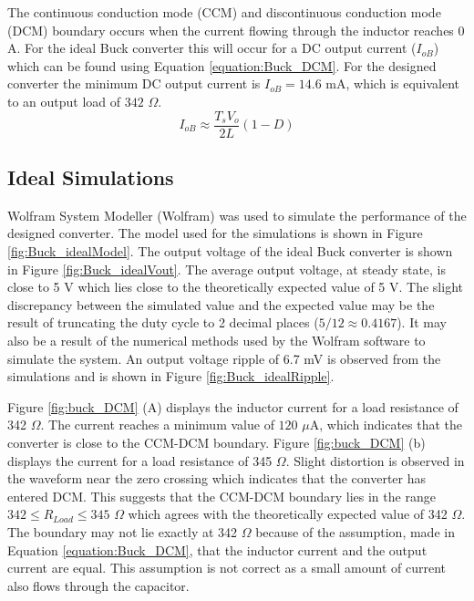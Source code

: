 \documentclass[12pt,twoside]{scrartcl}
\begin{document}
\vspace{5mm}
\noindent The continuous conduction mode (CCM) and discontinuous conduction mode (DCM) boundary occurs when the current flowing through the inductor reaches $0$ A. For the ideal Buck converter this will occur for a DC output current ($I_{oB}$) which can be found using Equation \ref{equation:Buck_DCM}. For the designed converter the minimum DC output current is $I_{oB} = 14.6$ mA, which is equivalent to an output load of $342$ $\Omega$.
\begin{equation}
I_{oB} \approx \frac{T_{s}V_{o}}{2L}(1-D) \label{equation:Buck_DCM}
\end{equation}
\pagebreak
\subsection{Ideal Simulations}
Wolfram System Modeller (Wolfram) was used to simulate the performance of the designed converter. The model used for the simulations is shown in Figure \ref{fig:Buck_idealModel}. The output voltage of the ideal Buck converter is shown in Figure \ref{fig:Buck_idealVout}. The average output voltage, at steady state, is close to 5 V which lies close to the theoretically expected value of 5 V. The slight discrepancy between the simulated value and the expected value may be the result of truncating the duty cycle to 2 decimal places ($5/12 \approx 0.4167$). It may also be a result of the numerical methods used by the Wolfram software to simulate the system. An output voltage ripple of 6.7 mV is observed from the simulations and is shown in Figure \ref{fig:Buck_idealRipple}.\par
\vspace{5mm}
\noindent Figure \ref{fig:buck_DCM} (A) displays the inductor current for a load resistance of 342 $\Omega$. The current reaches a minimum value of $120 $ $\mu$A, which indicates that the converter is close to the CCM-DCM boundary. Figure \ref{fig:buck_DCM} (b) displays the current for a load resistance of 345 $\Omega$. Slight distortion is observed in the waveform near the zero crossing which indicates that the converter has entered DCM. This suggests that the CCM-DCM boundary lies in the range $342 \le R_{Load} \le 345$ $\Omega$ which agrees with the theoretically expected value of 342 $\Omega$. The boundary may not lie exactly at 342 $\Omega$ because of the assumption, made in Equation \ref{equation:Buck_DCM}, that the inductor current and the output current are equal. This assumption is not correct as a small amount of current also flows through the capacitor.
\end{document}
